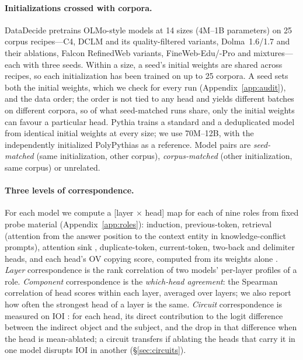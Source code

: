 \documentclass[11pt]{article}
\begin{document}
\paragraph{Initializations crossed with corpora.}
DataDecide pretrains OLMo-style models at 14 sizes (4M--1B parameters) on 25 corpus recipes---C4, DCLM and its quality-filtered variants, Dolma~1.6/1.7 and their ablations, Falcon RefinedWeb variants, FineWeb-Edu/-Pro and mixtures---each with three seeds.
Within a size, a seed's initial weights are shared across recipes, so each initialization has been trained on up to 25 corpora.
A seed sets both the initial weights, which we check for every run (Appendix~\ref{app:audit}), and the data order; the order is not tied to any head and yields different batches on different corpora, so of what seed-matched runs share, only the initial weights can favour a particular head.
Pythia trains a standard and a deduplicated model from identical initial weights at every size; we use 70M--12B, with the independently initialized PolyPythias \citep{vanderwal2025polypythias} as a reference.
Model pairs are \emph{seed-matched} (same initialization, other corpus), \emph{corpus-matched} (other initialization, same corpus) or unrelated.

\paragraph{Three levels of correspondence.}
For each model we compute a [layer $\times$ head] map for each of nine roles from fixed probe material (Appendix~\ref{app:roles}): induction, previous-token, retrieval (attention from the answer position to the context entity in knowledge-conflict prompts), attention sink \citep{xiao2024efficient}, duplicate-token, current-token, two-back and delimiter heads, and each head's OV copying score, computed from its weights alone \citep{elhage2021mathematical}.
\emph{Layer} correspondence is the rank correlation of two models' per-layer profiles of a role.
\emph{Component} correspondence is the \emph{which-head agreement}: the Spearman correlation of head scores within each layer, averaged over layers; we also report how often the strongest head of a layer is the same.
\emph{Circuit} correspondence is measured on IOI \citep{wang2023interpretability}: for each head, its direct contribution to the logit difference between the indirect object and the subject, and the drop in that difference when the head is mean-ablated; a circuit transfers if ablating the heads that carry it in one model disrupts IOI in another (\S\ref{sec:circuits}).
\end{document}
